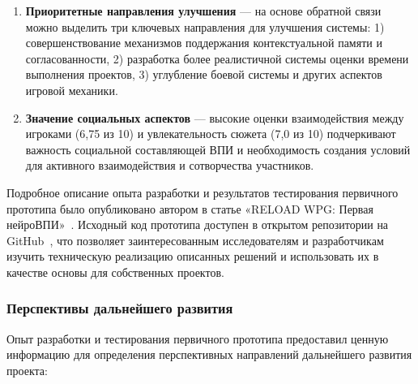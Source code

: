 \begin{enumerate}
    \item \textbf{Приоритетные направления улучшения} — на основе обратной связи можно выделить три ключевых направления для улучшения системы: 1) совершенствование механизмов поддержания контекстуальной памяти и согласованности, 2) разработка более реалистичной системы оценки времени выполнения проектов, 3) углубление боевой системы и других аспектов игровой механики.

    \item \textbf{Значение социальных аспектов} — высокие оценки взаимодействия между игроками (6,75 из 10) и увлекательность сюжета (7,0 из 10) подчеркивают важность социальной составляющей ВПИ и необходимость создания условий для активного взаимодействия и сотворчества участников.
\end{enumerate}

Подробное описание опыта разработки и результатов тестирования первичного прототипа было опубликовано автором в статье «RELOAD WPG: Первая нейроВПИ»~\cite{reload-article}. Исходный код прототипа доступен в открытом репозитории на GitHub~\cite{reload-github}, что позволяет заинтересованным исследователям и разработчикам изучить техническую реализацию описанных решений и использовать их в качестве основы для собственных проектов.

\subsubsection{Перспективы дальнейшего развития}

Опыт разработки и тестирования первичного прототипа предоставил ценную информацию для определения перспективных направлений дальнейшего развития проекта:

